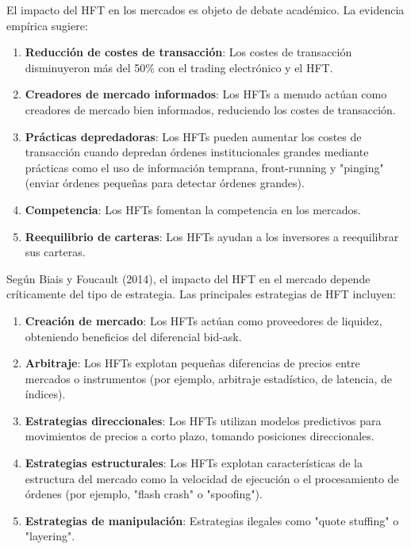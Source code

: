 \begin{teorema}
El impacto del HFT en los mercados es objeto de debate académico. La evidencia empírica sugiere:

\begin{enumerate}
\item \textbf{Reducción de costes de transacción}: Los costes de transacción disminuyeron más del 50\% con el trading electrónico y el HFT.

\item \textbf{Creadores de mercado informados}: Los HFTs a menudo actúan como creadores de mercado bien informados, reduciendo los costes de transacción.

\item \textbf{Prácticas depredadoras}: Los HFTs pueden aumentar los costes de transacción cuando depredan órdenes institucionales grandes mediante prácticas como el uso de información temprana, front-running y "pinging" (enviar órdenes pequeñas para detectar órdenes grandes).

\item \textbf{Competencia}: Los HFTs fomentan la competencia en los mercados.

\item \textbf{Reequilibrio de carteras}: Los HFTs ayudan a los inversores a reequilibrar sus carteras.
\end{enumerate}
\end{teorema}

\begin{proposicion}
Según Biais y Foucault (2014), el impacto del HFT en el mercado depende críticamente del tipo de estrategia. Las principales estrategias de HFT incluyen:

\begin{enumerate}
\item \textbf{Creación de mercado}: Los HFTs actúan como proveedores de liquidez, obteniendo beneficios del diferencial bid-ask.

\item \textbf{Arbitraje}: Los HFTs explotan pequeñas diferencias de precios entre mercados o instrumentos (por ejemplo, arbitraje estadístico, de latencia, de índices).

\item \textbf{Estrategias direccionales}: Los HFTs utilizan modelos predictivos para movimientos de precios a corto plazo, tomando posiciones direccionales.

\item \textbf{Estrategias estructurales}: Los HFTs explotan características de la estructura del mercado como la velocidad de ejecución o el procesamiento de órdenes (por ejemplo, "flash crash" o "spoofing").

\item \textbf{Estrategias de manipulación}: Estrategias ilegales como "quote stuffing" o "layering".
\end{enumerate}
\end{proposicion}

